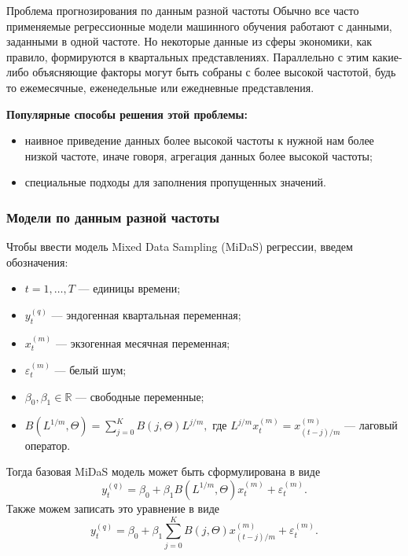 \documentclass[notheorems]{beamer}
\begin{document}
\begin{frame}
	{Проблема прогнозирования по данным разной частоты}
	Обычно все часто применяемые регрессионные модели машинного обучения работают с данными, заданными в одной частоте. Но некоторые данные из сферы экономики, как правило, формируются в квартальных представлениях. Параллельно с этим какие-либо объясняющие факторы могут быть собраны с более высокой частотой, будь то ежемесячные, еженедельные или ежедневные представления.
	
	\textbf{Популярные способы решения этой проблемы:}
	\begin{itemize}
		\item наивное приведение данных более высокой частоты к нужной нам более низкой частоте, иначе говоря, агрегация данных более высокой частоты;
		\item специальные подходы для заполнения пропущенных значений.
	\end{itemize}
\end{frame}
\begin{frame}
	\frametitle{Модели по данным разной частоты}
	Чтобы ввести модель Mixed Data Sampling (MiDaS) регрессии, введем обозначения:
	\begin{itemize}
		\item $t = 1,\ldots, T$ --- единицы времени;
		\item $y_{t}^{(q)}$ --- эндогенная квартальная переменная;
		\item $x^{(m)}_{t}$ --- экзогенная месячная переменная;
		\item $\varepsilon_t^{(m)}$ --- белый шум;
		\item $\beta_0, \beta_1 \in \mathbb R$ --- свободные переменные;
		\item $B(L^{1/m}, \Theta) = \sum\limits_{j=0}^{K} B(j, \Theta) L^{j/m},$ где $L^{j/m}x_t^{(m)} = x_{(t-j)/m}^{(m)}$ --- лаговый оператор.
	\end{itemize}
	Тогда базовая MiDaS модель может быть сформулирована в виде
	\begin{equation}
		y_t^{(q)} = \beta_0 + \beta_1B(L^{1/m}, \Theta) x_t^{(m)} + \varepsilon_t^{(m)}.
	\end{equation}
	Также можем записать это уравнение в виде
	\begin{equation}
		y_t^{(q)} = \beta_0 + \beta_1 \sum_{j=0}^{K} B(j,\Theta) x_{(t-j)/m}^{(m)} + \varepsilon_t^{(m)}.
	\end{equation}
\end{frame}
\end{document}
